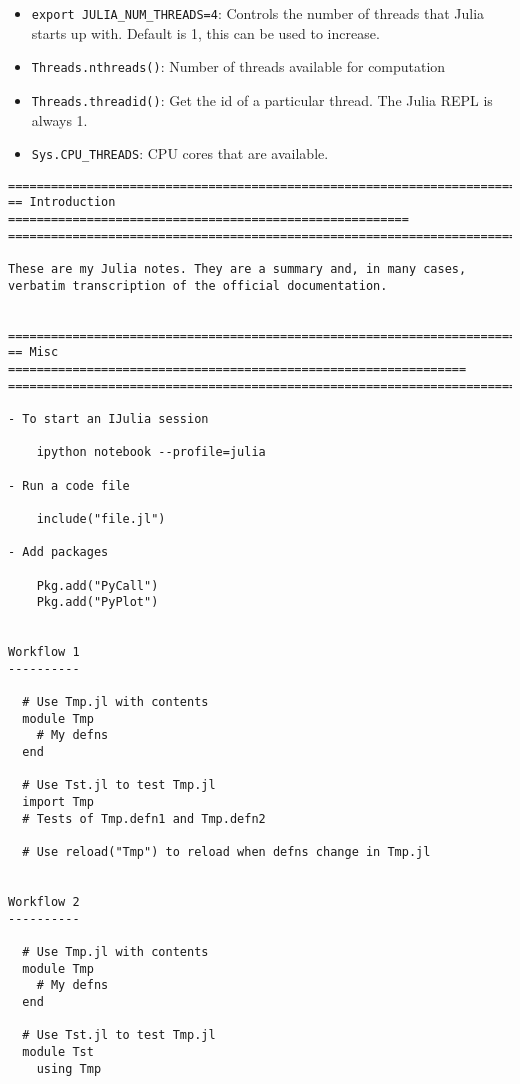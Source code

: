 \documentclass[12pt]{article}
\theoremstyle{plain}
\theoremstyle{definition}
\theoremstyle{remark}
\begin{document}
\begin{itemize}
  \item \texttt{export JULIA\_NUM\_THREADS=4}:
    Controls the number of threads that Julia starts up with.
    Default is 1, this can be used to increase.
  \item \texttt{Threads.nthreads()}: Number of threads available for computation
  \item \texttt{Threads.threadid()}:
    Get the id of a particular thread.
    The Julia REPL is always 1.

  \item \texttt{Sys.CPU\_THREADS}:
    CPU cores that are available.
\end{itemize}




\clearpage
\begin{lstlisting}
========================================================================
== Introduction ========================================================
========================================================================

These are my Julia notes. They are a summary and, in many cases,
verbatim transcription of the official documentation.


========================================================================
== Misc ================================================================
========================================================================

- To start an IJulia session

    ipython notebook --profile=julia

- Run a code file

    include("file.jl")

- Add packages

    Pkg.add("PyCall")
    Pkg.add("PyPlot")


Workflow 1
----------

  # Use Tmp.jl with contents
  module Tmp
    # My defns
  end

  # Use Tst.jl to test Tmp.jl
  import Tmp
  # Tests of Tmp.defn1 and Tmp.defn2

  # Use reload("Tmp") to reload when defns change in Tmp.jl


Workflow 2
----------

  # Use Tmp.jl with contents
  module Tmp
    # My defns
  end

  # Use Tst.jl to test Tmp.jl
  module Tst
    using Tmp


\end{lstlisting}
\end{document}
